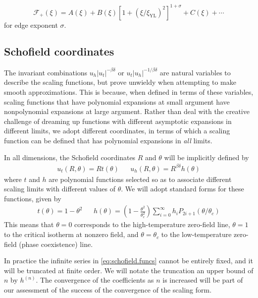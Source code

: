 \documentclass[
  aps,
  pre,
  preprint,
  longbibliography,
  floatfix
]{revtex4-2}
\begin{document}
\begin{equation}
  \mathcal F_+(\xi)
  =A(\xi) +B(\xi)[1+(\xi/\xi_{\mathrm{YL}})^2]^{1+\sigma}+C(\xi)+\cdots
\end{equation}
for edge exponent $\sigma$.

\cite{Cardy_1985_Conformal}
\cite{Connelly_2020_Universal}
\cite{An_2016_Functional}
\cite{Zambelli_2017_Lee-Yang}
\cite{Gliozzi_2014_Critical}

\subsection{Schofield coordinates}

The invariant combinations $u_h|u_t|^{-\beta\delta}$ or
$u_t|u_h|^{-1/\beta\delta}$ are natural variables to describe the scaling
functions, but prove unwieldy when attempting to make smooth approximations.
This is because, when defined in terms of these variables, scaling functions
that have polynomial expansions at small argument have nonpolynomial expansions
at large argument. Rather than deal with the creative challenge of dreaming up
functions with different asymptotic expansions in different limits, we adopt
different coordinates, in terms of which a scaling function can be defined that
has polynomial expansions in \emph{all} limits.

In all dimensions, the Schofield coordinates $R$ and $\theta$ will be implicitly defined by
\begin{align} \label{eq:schofield}
  u_t(R, \theta) = Rt(\theta)
  &&
  u_h(R, \theta) = R^{\beta\delta}h(\theta)
\end{align}
where $t$ and $h$ are polynomial functions selected so as to associate different scaling limits with different values of $\theta$. We will adopt standard forms for these functions, given by
\begin{align} \label{eq:schofield.funcs}
  t(\theta)=1-\theta^2
  &&
  h(\theta)=\left(1-\frac{\theta^2}{\theta_c^2}\right)\sum_{i=0}^\infty h_iP_{2i+1}(\theta/\theta_c)
\end{align}
This means that $\theta=0$ corresponds to the high-temperature zero-field line,
$\theta=1$ to the critical isotherm at nonzero field, and $\theta=\theta_c$ to
the low-temperature zero-field (phase coexistence) line.

In practice the infinite series in \eqref{eq:schofield.funcs} cannot be
entirely fixed, and it will be truncated at finite order. We will notate the
truncation an upper bound of $n$ by $h^{(n)}$. The convergence of the
coefficients as $n$ is increased will be part of our assessment of the success
of the convergence of the scaling form.
\end{document}
